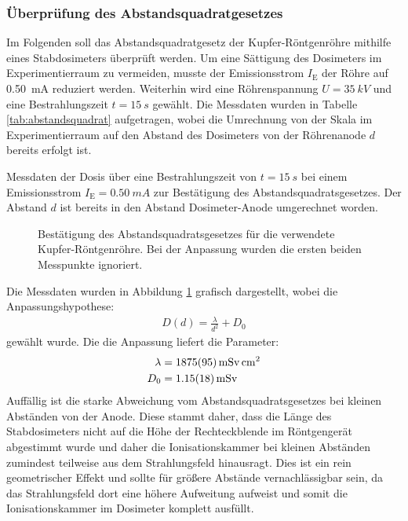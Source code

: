 \documentclass[11pt, a4paper]{article}
\numberwithin{equation}{section}
\begin{document}
\subsubsection{Überprüfung des Abstandsquadratgesetzes}
Im Folgenden soll das Abstandsquadratgesetz der Kupfer-Röntgenröhre mithilfe eines Stabdosimeters überprüft werden.
Um eine Sättigung des Dosimeters im Experimentierraum zu vermeiden, musste der Emissionsstrom $I_\mathrm{E}$ der Röhre auf \SI{0.50}{mA} reduziert werden.
Weiterhin wird eine Röhrenspannung $U = \SI{35}{kV}$ und eine Bestrahlungszeit $t = \SI{15}{s}$ gewählt.
Die Messdaten wurden in Tabelle \ref{tab:abstandsquadrat} aufgetragen, wobei die Umrechnung von der Skala im Experimentierraum auf den Abstand des Dosimeters von der Röhrenanode $d$ bereits erfolgt ist.
\begin{table}[ht]
	\centering
	
	\caption{Messdaten der Dosis über eine Bestrahlungszeit von $t=\SI{15}{s}$ bei einem Emissionsstrom $I_\mathrm{E} = \SI{0.50}{mA}$ zur Bestätigung des Abstandsquadratsgesetzes. Der Abstand $d$ ist bereits in den Abstand Dosimeter-Anode umgerechnet worden.}
	\label{tab:abstandsquadrat}
\end{table}
\begin{figure}[ht]
	\centering
	
	\caption{Bestätigung des Abstandsquadratsgesetzes für die verwendete Kupfer-Röntgenröhre. Bei der Anpassung wurden die ersten beiden Messpunkte ignoriert.}
	\label{fig:abstandsquadrat}
\end{figure}
Die Messdaten wurden in Abbildung \ref{fig:abstandsquadrat} grafisch dargestellt, wobei die Anpassungshypothese:
\begin{align}
	D(d) = \frac{\lambda}{d^2} + D_0
\end{align}
gewählt wurde.
Die die Anpassung liefert die Parameter:
\begin{align*}
	\lambda &= \SI{1875 +- 95}{\milli\sievert\centi\metre\squared}\\
	D_0 &= \SI{1.15 +- 0.18}{\milli\sievert}
\end{align*}
Auffällig ist die starke Abweichung vom Abstandsquadratsgesetzes bei kleinen Abständen von der Anode.
Diese stammt daher, dass die Länge des Stabdosimeters nicht auf die Höhe der Rechteckblende im Röntgengerät abgestimmt wurde und daher die Ionisationskammer bei kleinen Abständen zumindest teilweise aus dem Strahlungsfeld hinausragt.
Dies ist ein rein geometrischer Effekt und sollte für größere Abstände vernachlässigbar sein, da das Strahlungsfeld dort eine höhere Aufweitung aufweist und somit die Ionisationskammer im Dosimeter komplett ausfüllt.
\end{document}
